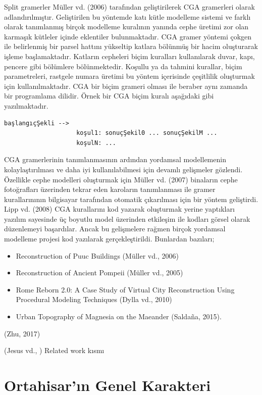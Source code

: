 \documentclass[12pt,turkish,a4paperpaper,]{report}
\providecommand{\tightlist}{%
  \setlength{\itemsep}{0pt}\setlength{\parskip}{0pt}}
\begin{document}
Split gramerler Müller vd. (2006) tarafından geliştirilerek CGA
gramerleri olarak adlandırılmıştır. Geliştirilen bu yöntemde katı kütle
modelleme sistemi ve farklı olarak tanımlanmış birçok modelleme
kuralının yanında cephe üretimi zor olan karmaşık kütleler içinde
eklentiler bulunmaktadır. CGA gramer yöntemi çokgen ile belirlenmiş bir
parsel hattını yükseltip katlara bölünmüş bir hacim oluşturarak işleme
başlamaktadır. Katların cepheleri biçim kuralları kullanılarak duvar,
kapı, pencere gibi bölümlere bölünmektedir. Koşullu ya da tahmini
kurallar, biçim parametreleri, rastgele numara üretimi bu yöntem
içerisinde çeşitlilik oluşturmak için kullanılmaktadır. CGA bir biçim
grameri olması ile beraber aynı zamanda bir programlama dilidir. Örnek
bir CGA biçim kuralı aşağıdaki gibi yazılmaktadır.

\begin{verbatim}
başlangıçŞekli -->
                    koşul1: sonuçŞekil0 ... sonuçŞekilM ...
                    koşulN: ...
\end{verbatim}

CGA gramerlerinin tanımlanmasının ardından yordamsal modellemenin
kolaylaştırılması ve daha iyi kullanılabilmesi için devamlı gelişmeler
gözlendi. Özellikle cephe modelleri oluşturmak için Müller vd. (2007)
binaların cephe fotoğrafları üzerinden tekrar eden karoların
tanımlanması ile gramer kurallarınının bilgisayar tarafından otomatik
çıkarılması için bir yöntem geliştirdi. Lipp vd. (2008) CGA kurallarını
kod yazarak oluşturmak yerine yaptıkları yazılım sayesinde üç boyutlu
model üzerinden etkileşim ile kodları görsel olarak düzenlemeyi
başardılar. Ancak bu gelişmelere rağmen birçok yordamsal modelleme
projesi kod yazılarak gerçekleştirildi. Bunlardan bazıları;

\begin{itemize}
\tightlist
\item
  Reconstruction of Puuc Buildings (Müller vd., 2006)
\item
  Reconstruction of Ancient Pompeii (Müller vd., 2005)
\item
  Rome Reborn 2.0: A Case Study of Virtual City Reconstruction Using
  Procedural Modeling Techniques (Dylla vd., 2010)
\item
  Urban Topography of Magnesia on the Maeander (Saldaña, 2015).
\end{itemize}

(Zhu, 2017)

(Jesus vd., ) Related work kısmı

\hypertarget{ortahisarux131n-genel-karakteri}{%
\section{Ortahisar'ın Genel
Karakteri}\label{ortahisarux131n-genel-karakteri}}
\end{document}
